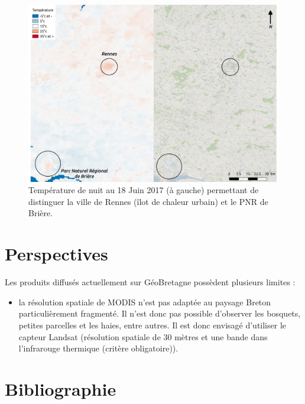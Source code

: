 \documentclass[10pt,a4paper]{article}
\begin{document}
\begin{figure}[!h]
\centering
\includegraphics[scale=0.33]{img/TN_interpretation1.pdf}
\caption{Température de nuit au 18 Juin 2017 (à gauche) permettant de distinguer la ville de Rennes (îlot de chaleur urbain) et le PNR de Brière.}
\label{TN1}
\end{figure}

\section{Perspectives}

Les produits diffusés actuellement sur GéoBretagne possèdent plusieurs limites :
\begin{itemize}
\item la résolution spatiale de MODIS n'est pas adaptée au paysage Breton particulièrement fragmenté. Il n'est donc pas possible d'observer les bosquets, petites parcelles et les haies, entre autres. Il est donc envisagé d'utiliser le capteur Landsat (résolution spatiale de 30 mètres et une bande dans l'infrarouge thermique (critère obligatoire)).
\end{itemize}

\section{Bibliographie}
\end{document}

